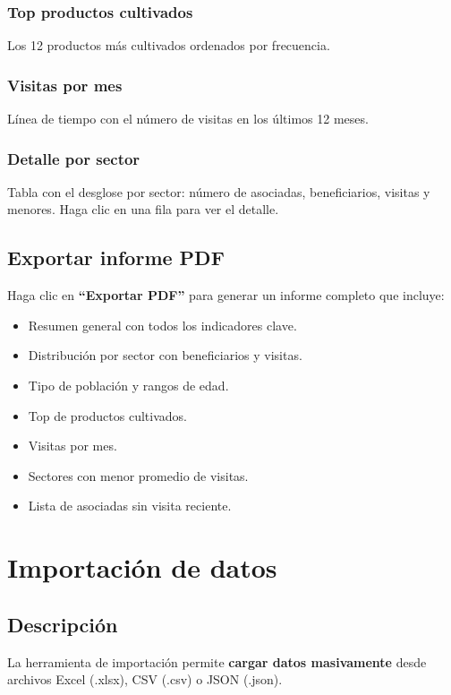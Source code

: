 \documentclass[12pt]{article}
\begin{document}
\subsubsection{Top productos cultivados}
Los 12 productos más cultivados ordenados por frecuencia.

\subsubsection{Visitas por mes}
Línea de tiempo con el número de visitas en los últimos 12 meses.

\subsubsection{Detalle por sector}
Tabla con el desglose por sector: número de asociadas, beneficiarios, visitas y menores. Haga clic en una fila para ver el detalle.

\subsection{Exportar informe PDF}
Haga clic en \textbf{``Exportar PDF''} para generar un informe completo que incluye:
\begin{itemize}[nosep]
  \item Resumen general con todos los indicadores clave.
  \item Distribución por sector con beneficiarios y visitas.
  \item Tipo de población y rangos de edad.
  \item Top de productos cultivados.
  \item Visitas por mes.
  \item Sectores con menor promedio de visitas.
  \item Lista de asociadas sin visita reciente.
\end{itemize}

\section{Importación de datos}
\label{sec:importar}

\subsection{Descripción}
\label{subsec:importar-descripcion}

La herramienta de importación permite \textbf{cargar datos masivamente} desde archivos Excel (.xlsx), CSV (.csv) o JSON (.json).
\end{document}
